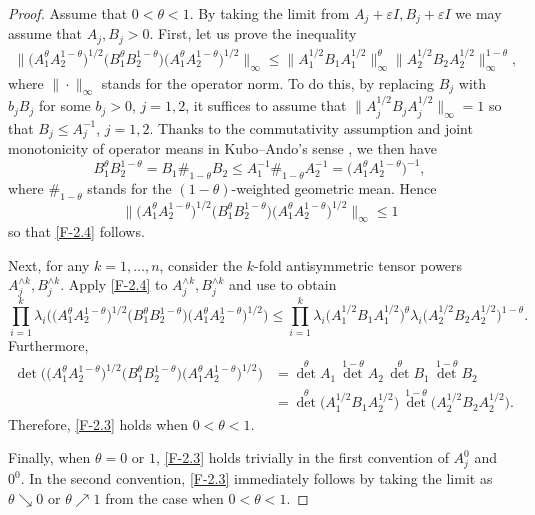 \documentclass[11pt,reqno]{article}
\numberwithin{equation}{section}
\def\eps{\varepsilon}
\begin{document}
\begin{proof}
Assume that $0<\theta<1$. By taking the limit from $A_j+\eps I,B_j+\eps I$ we may assume that $A_j,B_j>0$. First,
let us prove the inequality
\begin{align}\label{F-2.4}
\big\|\bigl(A_1^\theta A_2^{1-\theta}\bigr)^{1/2}\bigl(B_1^\theta B_2^{1-\theta}\bigr)
\bigl(A_1^\theta A_2^{1-\theta}\bigr)^{1/2}\big\|_\infty
\le\big\|A_1^{1/2}B_1A_1^{1/2}\big\|_\infty^\theta\big\|A_2^{1/2}B_2A_2^{1/2}\big\|_\infty^{1-\theta},
\end{align}
where $\|\cdot\|_\infty$ stands for the operator norm. To do this, by replacing $B_j$ with $b_jB_j$ for some $b_j>0$,
$j=1,2$, it suffices to assume that $\big\|A_j^{1/2}B_jA_j^{1/2}\big\|_\infty=1$ so that $B_j\le A_j^{-1}$, $j=1,2$.
Thanks to the commutativity assumption and joint monotonicity of operator means in Kubo--Ando's sense
\cite{KA,Hi1}, we then have
\[
B_1^\theta B_2^{1-\theta}=B_1\#_{1-\theta} B_2\le A_1^{-1}\#_{1-\theta} A_2^{-1}
=\bigl(A_1^\theta A_2^{1-\theta}\bigr)^{-1},
\]
where $\#_{1-\theta}$ stands for the $(1-\theta)$-weighted geometric mean. Hence
\[
\big\|\bigl(A_1^\theta A_2^{1-\theta}\bigr)^{1/2}\bigl(B_1^\theta B_2^{1-\theta}\bigr)
\bigl(A_1^\theta A_2^{1-\theta}\bigr)^{1/2}\big\|_\infty\le1
\]
so that \eqref{F-2.4} follows.

Next, for any $k=1,\dots,n$, consider the $k$-fold antisymmetric tensor powers $A_j^{\wedge k},B_j^{\wedge k}$.
Apply \eqref{F-2.4} to $A_j^{\wedge k},B_j^{\wedge k}$ and use \cite[Lemmas 4.6.2, 4.6.3]{Hi1} to obtain
\[
\prod_{i=1}^k\lambda_i\bigl(\bigl(A_1^\theta A_2^{1-\theta}\bigr)^{1/2}\bigl(B_1^\theta B_2^{1-\theta}\bigr)
\bigl(A_1^\theta A_2^{1-\theta}\bigr)^{1/2}\bigr)
\le\prod_{i=1}^k\lambda_i\bigl(A_1^{1/2}B_1A_1^{1/2}\bigr)^\theta
\lambda_i\bigl(A_2^{1/2}B_2A_2^{1/2}\bigr)^{1-\theta}.
\]
Furthermore,
\begin{align*}
\det\bigl(\bigl(A_1^\theta A_2^{1-\theta}\bigr)^{1/2}\bigl(B_1^\theta B_2^{1-\theta}\bigr)
\bigl(A_1^\theta A_2^{1-\theta}\bigr)^{1/2}\bigr)
&={\det}^\theta A_1\,{\det}^{1-\theta} A_2\,{\det}^\theta B_1\,{\det}^{1-\theta} B_2 \\
&={\det}^\theta\bigl(A_1^{1/2}B_1A_2^{1/2}\bigr)\,{\det}^{1-\theta}\bigl(A_2^{1/2}B_2A_2^{1/2}\bigr).
\end{align*}
Therefore, \eqref{F-2.3} holds when $0<\theta<1$.

Finally, when $\theta=0$ or $1$, \eqref{F-2.3} holds trivially in the first convention of $A_j^0$ and $0^0$. In the
second convention, \eqref{F-2.3} immediately follows by taking the limit as $\theta\searrow0$ or $\theta\nearrow1$
from the case when $0<\theta<1$.
\end{proof}
\end{document}
